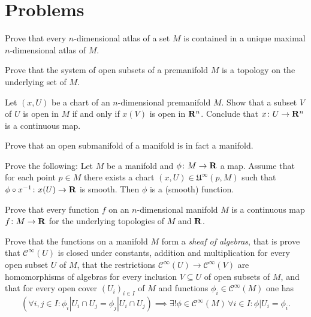 \section{Problems}

\begin{xca}
  Prove that every $n$-dimensional atlas of a set $M$ is contained in a unique
  maximal $n$-dimensional atlas of $M$.
\end{xca}

\begin{xca}
  Prove that the system of open subsets of a premanifold $M$ is a topology on
  the underlying set of $M$.
\end{xca}

\begin{xca}
  Let $(x, U)$ be a chart of an $n$-dimensional premanifold $M$. Show that a 
  subset $V$ of $U$ is open in $M$ if and only if $x(V)$ is open in $\mathbf{R}^n$.
  Conclude that $x\colon U \to \mathbf{R}^n$ is a continuous map.
\end{xca}

\begin{xca}
  Prove that an open submanifold of a manifold is in fact a manifold.
\end{xca}

\begin{xca}
  Prove the following:
  Let $M$ be a manifold and $\phi\colon M \to \mathbf{R}$ a map. Assume that for each
  point $p \in M$ there exists a chart $(x, U) \in \mathfrak U^\infty(p, M)$
  such that $\phi \circ x^{-1}\colon x(U) \to \mathbf{R}$ is smooth. Then $\phi$
  is a (smooth) function.
\end{xca}

\begin{xca}
  Prove that every function $f$ on an $n$-dimensional manifold $M$ is a
  continuous map $f\colon M \to \mathbf{R}$ for the underlying topologies of $M$ and
  $\mathbf{R}$.
\end{xca}

\begin{xca}
  Prove that the functions on a manifold $M$ form a \emph{sheaf of algebras},
  that is prove that $\mathcal C^\infty(U)$ is closed under constants,
  addition and multiplication for every open subset $U$ of $M$, that the restrictions
  $\mathcal C^\infty(U) \to \mathcal C^\infty(V)$ are homomorphisms of algebras
  for every inclusion $V \subseteq U$ of open subsets of $M$, and that 
  for every open cover $(U_i)_{i \in I}$ of $M$ and functions
  $\phi_i \in \mathcal C^\infty(M)$ one has
  \[
    \left(\forall i, j \in I : \phi_i|U_i \cap U_j = \phi_j|U_i \cap U_j\right)
    \implies \exists! \phi \in \mathcal C^\infty(M) \, \forall i \in I :
    \phi|U_i = \phi_i.
  \]
\end{xca}

